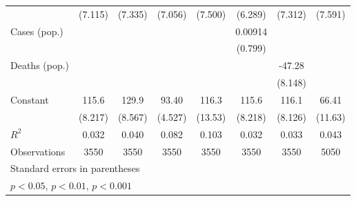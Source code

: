 \documentclass{article}
\begin{document}
{\begin{longtable}{l*{7}{c}}
                &  (7.115)         &  (7.335)         &  (7.056)         &  (7.500)         &  (6.289)         &  (7.312)         &  (7.591)         \\
Cases (pop.)    &                  &                  &                  &                  &  0.00914         &                  &                  \\
                &                  &                  &                  &                  &  (0.799)         &                  &                  \\
Deaths (pop.)   &                  &                  &                  &                  &                  &   -47.28\sym{***}&                  \\
                &                  &                  &                  &                  &                  &  (8.148)         &                  \\
Constant        &    115.6\sym{***}&    129.9\sym{***}&    93.40\sym{***}&    116.3\sym{***}&    115.6\sym{***}&    116.1\sym{***}&    66.41\sym{***}\\
                &  (8.217)         &  (8.567)         &  (4.527)         &  (13.53)         &  (8.218)         &  (8.126)         &  (11.63)         \\
\hline
\(R^{2}\)       &    0.032         &    0.040         &    0.082         &    0.103         &    0.032         &    0.033         &    0.043         \\
Observations    &     3550         &     3550         &     3550         &     3550         &     3550         &     3550         &     5050         \\
\hline\hline
\multicolumn{8}{l}{\footnotesize Standard errors in parentheses}\\
\multicolumn{8}{l}{\footnotesize \sym{*} \(p<0.05\), \sym{**} \(p<0.01\), \sym{***} \(p<0.001\)}\\
\end{longtable}
}
\end{document}
